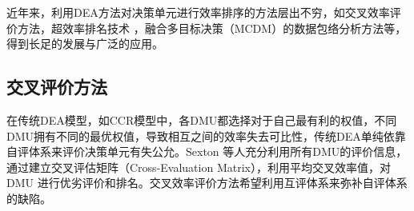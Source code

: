 近年来，利用DEA方法对决策单元进行效率排序的方法层出不穷\cite{adler2002review,rita2011ranking}，如交叉效率评价方法\cite{sexton1986data}，超效率排名技术
\cite{andersen1993procedure}，融合多目标决策（MCDM）的数据包络分析方法\cite{jahanshahloo2005note}等，得到长足的发展与广泛的应用。

\subsection{交叉评价方法}
在传统DEA模型，如CCR模型中，各DMU都选择对于自己最有利的权值，不同DMU拥有不同的最优权值，导致相互之间的效率失去可比性，传统DEA单纯依靠自评体系来评价决策单元有失公允。Sexton 等人\cite{sexton1986data}充分利用所有DMU的评价信息，通过建立交叉评估矩阵（Cross-Evaluation Matrix），利用平均交叉效率值，对DMU 进行优劣评价和排名。交叉效率评价方法希望利用互评体系来弥补自评体系的缺陷。


